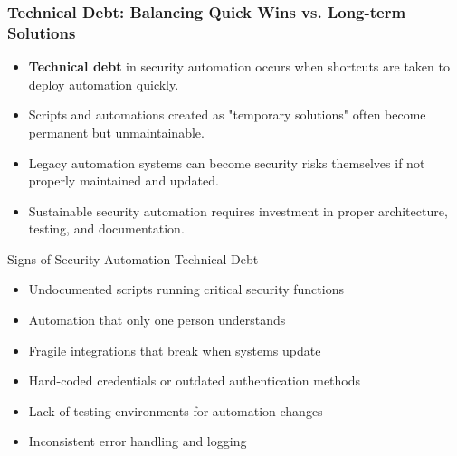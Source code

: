 \documentclass{beamer}
\begin{document}
\begin{frame}
  \frametitle{Technical Debt: Balancing Quick Wins vs. Long-term Solutions}
  
  \begin{itemize}
    \item \textbf{Technical debt} in security automation occurs when shortcuts are taken to deploy automation quickly.
    \item Scripts and automations created as "temporary solutions" often become permanent but unmaintainable.
    \item Legacy automation systems can become security risks themselves if not properly maintained and updated.
    \item Sustainable security automation requires investment in proper architecture, testing, and documentation.
  \end{itemize}
  
  \begin{alertblock}{Signs of Security Automation Technical Debt}
    \scriptsize
    \begin{itemize}
      \item Undocumented scripts running critical security functions
      \item Automation that only one person understands
      \item Fragile integrations that break when systems update
      \item Hard-coded credentials or outdated authentication methods
      \item Lack of testing environments for automation changes
      \item Inconsistent error handling and logging
    \end{itemize}
  \end{alertblock}
\end{frame}
\end{document}
